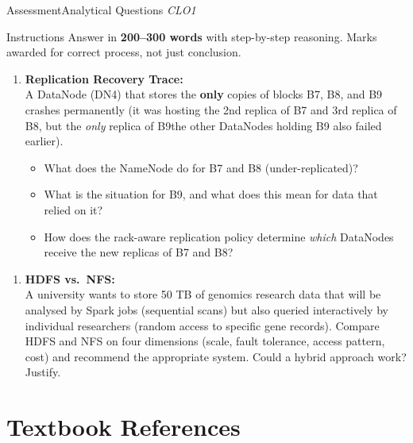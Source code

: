 \documentclass[aspectratio=169,10pt]{beamer}
\begin{document}
\begin{frame}{Assessment\textemdash Analytical Questions \hfill\small\textit{CLO1}}
  \begin{block}{Instructions}
    Answer in \textbf{200--300 words} with step-by-step reasoning.  Marks awarded for correct process, not just conclusion.
  \end{block}
  \vspace{6pt}
  \begin{enumerate}[\textbf{A1.}]
    \item \textbf{Replication Recovery Trace:}\\
    A DataNode (DN4) that stores the \textbf{only} copies of blocks B7, B8, and B9 crashes permanently (it was hosting the 2nd replica of B7 and 3rd replica of B8, but the \emph{only} replica of B9\textemdash the other DataNodes holding B9 also failed earlier).
    \begin{itemize}
      \small
      \item What does the NameNode do for B7 and B8 (under-replicated)?
      \item What is the situation for B9, and what does this mean for data that relied on it?
      \item How does the rack-aware replication policy determine \emph{which} DataNodes receive the new replicas of B7 and B8?
    \end{itemize}
  \end{enumerate}
  \vspace{6pt}
  \begin{enumerate}[\textbf{A2.}]
    \item \textbf{HDFS vs.\ NFS:}\\
    A university wants to store 50 TB of genomics research data that will be analysed by Spark jobs (sequential scans) but also queried interactively by individual researchers (random access to specific gene records).  Compare HDFS and NFS on four dimensions (scale, fault tolerance, access pattern, cost) and recommend the appropriate system.  Could a hybrid approach work?  Justify.
  \end{enumerate}
\end{frame}

\section*{Textbook References}
\end{document}
